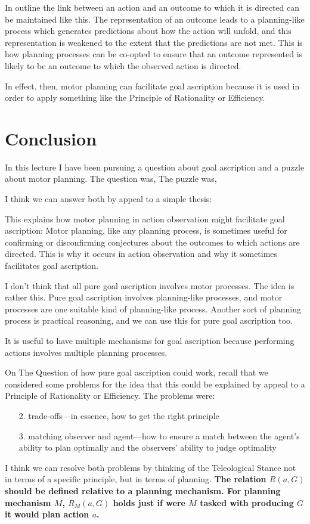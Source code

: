 \documentclass[12pt,\papersize]{extarticle}
\begin{document}
In outline the link between an action and an outcome to which it is directed can be maintained like this. The representation of an outcome leads to a planning-like process which generates predictions about how the action will unfold, and this representation is weakened to the extent that the predictions are not met.  This is how planning processes can be co-opted to ensure that an outcome represented is likely to be an outcome to which the observed action is directed.

In effect, then,
	 motor planning can facilitate goal ascription
	 because it is used in order to apply something like the Principle of Rationality or Efficiency.



\section{Conclusion}
In this lecture I have been 
	pursuing a question about goal ascription 
and
	a puzzle about motor planning.
The question was, \theQuestion
The puzzle was, \thePuzzle

I think we can answer both by appeal to a simple thesis:
\begin{quote}
\theThesis
\end{quote}

This explains how motor planning in action observation might facilitate goal ascription: 
Motor planning, like any planning process,  is sometimes useful for confirming or disconfirming conjectures about the outcomes to which actions are directed.
This is why it occurs in action observation and why it sometimes facilitates goal ascription.

I don't think that all pure goal ascription involves motor processes.
The idea is rather this.
Pure goal ascription involves planning-like processes, and motor processes are one suitable kind of planning-like process.
Another sort of planning process is practical reasoning, and we can use this for pure goal ascription too.

It is useful to have multiple mechanisms for goal ascription because performing actions involves multiple planning processes.


On The Question of how pure goal ascription could work,
	recall that we considered some problems for the idea that
	this could be explained by appeal to a Principle of Rationality or Efficiency.
The problems were:
%
\begin{itemize}
\item[2.] trade-offs---in essence, how to get the right principle
\item[3.] matching observer and agent---how to ensure a match between the agent's ability to plan optimally and the observers' ability to judge optimality
\end{itemize}
%
I think we can resolve both problems by thinking of the Teleological Stance not in terms of a specific principle, but in terms of planning.
\textbf{
The relation $R(a,G)$ should be defined relative to a planning mechanism.
For planning mechanism $M$, $R{_M}(a,G)$ holds just if were $M$  tasked with producing $G$ it would plan action $a$.}
\end{document}
